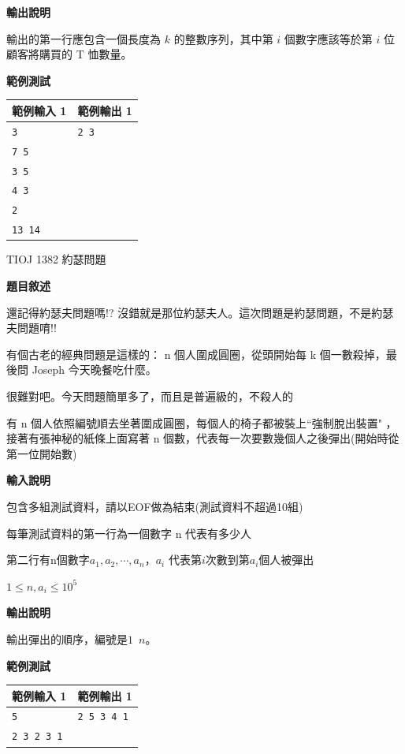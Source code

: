     \textbf{輸出說明}

    輸出的第一行應包含一個長度為 $k$ 的整數序列，其中第 $i$ 個數字應該等於第 $i$ 位顧客將購買的 T 恤數量。

    \textbf{範例測試}

    \begin{tabular}{|m{7cm}|m{7cm}|}
        \hline
        範例輸入 1 & 範例輸出 1 \\
        \hline
        \verb|3| & \verb|2 3| \\
        \verb|7 5| & \\
        \verb|3 5| & \\
        \verb|4 3| & \\
        \verb|2| & \\
        \verb|13 14|& \\
        \hline
    \end{tabular}

    \problem TIOJ 1382 約瑟問題

    \textbf{題目敘述}

    還記得約瑟夫問題嗎!? 沒錯就是那位約瑟夫人。這次問題是約瑟問題，不是約瑟夫問題唷!!

    有個古老的經典問題是這樣的：
    n 個人圍成圓圈，從頭開始每 k 個一數殺掉，最後問 Joseph 今天晚餐吃什麼。

    很難對吧。今天問題簡單多了，而且是普遍級的，不殺人的

    有 n 個人依照編號順去坐著圍成圓圈，每個人的椅子都被裝上``強制脫出裝置" 
    ，接著有張神秘的紙條上面寫著 n 個數，代表每一次要數幾個人之後彈出(開始時從第一位開始數)

    \textbf{輸入說明}

    包含多組測試資料，請以EOF做為結束(測試資料不超過10組)

    每筆測試資料的第一行為一個數字 n 代表有多少人

    第二行有n個數字$a_1,a_2, \cdots , a_n$，$a_i$ 代表第$i$次數到第$a_i$個人被彈出
    
    $1 \le n,a_i \le 10^5$

    \textbf{輸出說明}

    輸出彈出的順序，編號是$1$~$n$。

    \textbf{範例測試}

    \begin{tabular}{|m{7cm}|m{7cm}|}
        \hline
        範例輸入 1 & 範例輸出 1 \\
        \hline
        \verb|5| & \verb|2 5 3 4 1| \\
        \verb|2 3 2 3 1| & \\
        \hline
    \end{tabular}